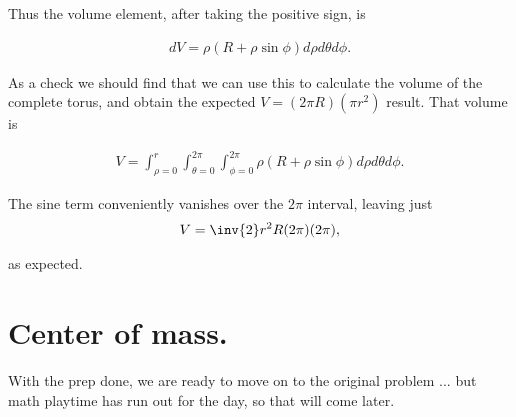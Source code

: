 Thus the volume element, after taking the positive sign, is

\begin{align}\label{eqn:torusCenterOfMass:6}
dV = \rho \left( R + \rho \sin\phi \right) d\rho d\theta d\phi.
\end{align}

As a check we should find that we can use this to calculate the volume of the complete torus, and obtain the expected $V = (2 \pi R) (\pi r^2)$ result.  That volume is

\begin{align}\label{eqn:torusCenterOfMass:7}
V = \int_{\rho=0}^r \int_{\theta=0}^{2\pi} \int_{\phi=0}^{2\pi} \rho \left( R + \rho \sin\phi \right) d\rho d\theta d\phi.
\end{align}

The sine term conveniently vanishes over the $2\pi$ interval, leaving just
\begin{align}\label{eqn:torusCenterOfMass:8}
V = \inv{2} r^2 R (2 \pi)(2 \pi),
\end{align}

as expected.

\section{Center of mass.}

With the prep done, we are ready to move on to the original problem ... but math playtime has run out for the day, so that will come later.

\EndNoBibArticle
